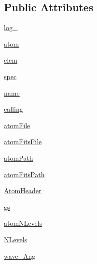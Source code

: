 \subsection*{Public Attributes}
\begin{DoxyCompactItemize}
\item 
\hyperlink{classpyneb_1_1core_1_1pynebcore_1_1___atom_data_fits_a8919598e2830080299dcfe70249d4a15}{log\+\_\+}
\item 
\hyperlink{classpyneb_1_1core_1_1pynebcore_1_1___atom_data_fits_a489ba89fa2e99786afc077e82acace4c}{atom}
\item 
\hyperlink{classpyneb_1_1core_1_1pynebcore_1_1___atom_data_fits_a4724ac766d9c28d48fdcf43f50bd8478}{elem}
\item 
\hyperlink{classpyneb_1_1core_1_1pynebcore_1_1___atom_data_fits_a28f8a716cd11ea24726de792fdfb5573}{spec}
\item 
\hyperlink{classpyneb_1_1core_1_1pynebcore_1_1___atom_data_fits_ac3d861a23f94412d8ae28aeb15a98170}{name}
\item 
\hyperlink{classpyneb_1_1core_1_1pynebcore_1_1___atom_data_fits_a70465eedf1ac0b8e43360bc423be9c93}{calling}
\item 
\hyperlink{classpyneb_1_1core_1_1pynebcore_1_1___atom_data_fits_add12b2ae3c11a68438ebf4bcf79fd6d0}{atom\+File}
\item 
\hyperlink{classpyneb_1_1core_1_1pynebcore_1_1___atom_data_fits_a2523c95ccdad4f27adb19799da3c70b5}{atom\+Fits\+File}
\item 
\hyperlink{classpyneb_1_1core_1_1pynebcore_1_1___atom_data_fits_a2a9232b1a5ad60259d33d934e2cf5bf3}{atom\+Path}
\item 
\hyperlink{classpyneb_1_1core_1_1pynebcore_1_1___atom_data_fits_a6606b085964dbd4011085454b30efe41}{atom\+Fits\+Path}
\item 
\hyperlink{classpyneb_1_1core_1_1pynebcore_1_1___atom_data_fits_a660b5b881aa31dd7dcb6fecfe0735f70}{Atom\+Header}
\item 
\hyperlink{classpyneb_1_1core_1_1pynebcore_1_1___atom_data_fits_ae8ab3604ecbf05c1f668717fc13e9dc2}{gs}
\item 
\hyperlink{classpyneb_1_1core_1_1pynebcore_1_1___atom_data_fits_a4ff73bfa251e1139692c2a60f9821315}{atom\+N\+Levels}
\item 
\hyperlink{classpyneb_1_1core_1_1pynebcore_1_1___atom_data_fits_a85c3a2d0c1cdbecc851be17237caff63}{N\+Levels}
\item 
\hyperlink{classpyneb_1_1core_1_1pynebcore_1_1___atom_data_fits_a904df923201dd16936845199622afc76}{wave\+\_\+\+Ang}
\end{DoxyCompactItemize}
